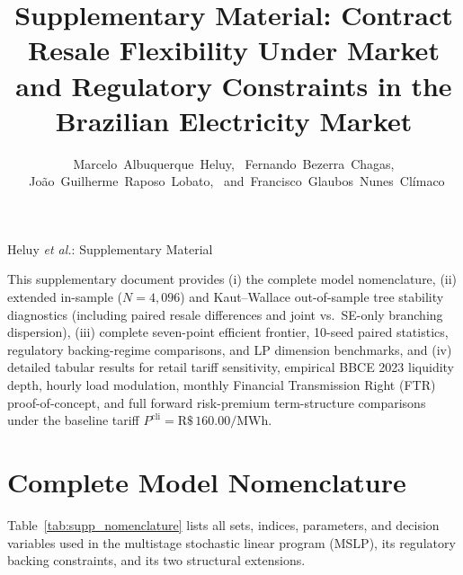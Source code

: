 \documentclass[10pt,journal]{IEEEtran}
\begin{document}
\title{Supplementary Material: Contract Resale Flexibility Under Market and Regulatory Constraints in the Brazilian Electricity Market}

\author{Marcelo~Albuquerque~Heluy,%
        ~Fernando~Bezerra~Chagas,%
        ~Jo\~ao~Guilherme~Raposo~Lobato,%
        ~and~Francisco~Glaubos~Nunes~Cl\'imaco}

%
{Heluy \MakeLowercase{\textit{et al.}}: Supplementary Material}

\maketitle

This supplementary document provides (i) the complete model nomenclature, (ii) extended in-sample ($N = 4,096$) and Kaut--Wallace out-of-sample tree stability diagnostics (including paired resale differences and joint vs.\ SE-only branching dispersion), (iii) complete seven-point efficient frontier, 10-seed paired statistics, regulatory backing-regime comparisons, and LP dimension benchmarks, and (iv) detailed tabular results for retail tariff sensitivity, empirical BBCE 2023 liquidity depth, hourly load modulation, monthly Financial Transmission Right (FTR) proof-of-concept, and full forward risk-premium term-structure comparisons under the baseline tariff $P^{\text{cli}} = \text{R\$}\,160.00/\text{MWh}$.

\section{Complete Model Nomenclature}
\label{sec:supp_nomen}

Table~\ref{tab:supp_nomenclature} lists all sets, indices, parameters, and decision variables used in the multistage stochastic linear program (MSLP), its regulatory backing constraints, and its two structural extensions.
\end{document}
